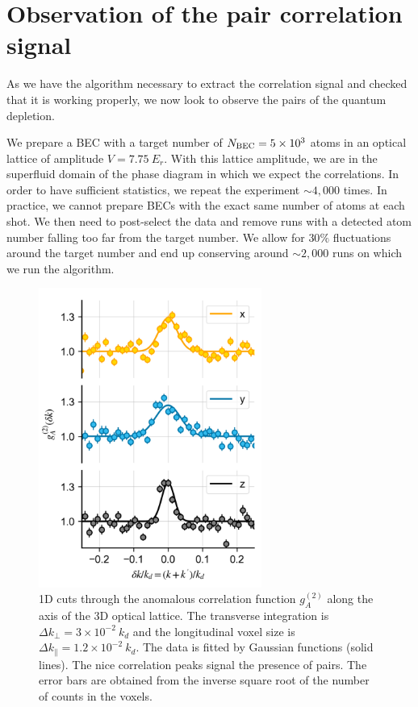 \section{Observation of the pair correlation signal}

\label{sec:post_selec}

As we have the algorithm necessary to extract the correlation signal and checked that it is working properly, we now look to observe the \kmk pairs of the quantum depletion.

We prepare a BEC with a target number of $N_{\rm{BEC}}=5 \times 10^3$ atoms in an optical lattice of amplitude $V=7.75 \ E_r$. With this lattice amplitude, we are in the superfluid domain of the phase diagram in which we expect the \kmk correlations. In order to have sufficient statistics, we repeat the experiment $\sim 4,000$ times. In practice, we cannot prepare BECs with the exact same number of atoms at each shot. We then need to post-select the data and remove runs with a detected atom number falling too far from the target number. We allow for $30 \%$ fluctuations around the target number and end up conserving around $\sim 2,000$ runs on which we run the algorithm.

\begin{figure}
    \centering
    \includegraphics[width=0.65\textwidth]{Fig/Chapter4/correlations_kmk_errorbars.png}
    \caption{1D cuts through the anomalous correlation function $g_{A}^{(2)}$ along the axis of the 3D optical lattice. The transverse integration is $\Delta k_{\perp}=3 \times 10^{-2} \ k_d$ and the longitudinal voxel size is $\Delta k_{\parallel}=1.2 \times 10^{-2} \ k_d$. The data is fitted by Gaussian functions (solid lines). The nice correlation peaks signal the presence of \kmk pairs. The error bars are obtained from the inverse square root of the number of counts in the voxels.}
    \label{fig:kmk_signal}
\end{figure}

